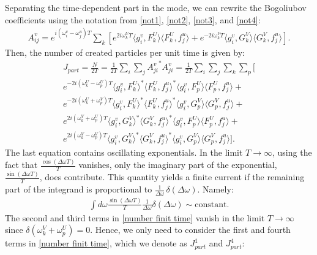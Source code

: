 \documentclass[12pt]{article}
\numberwithin{equation}{section}
\begin{document}
Separating the time-dependent part in the mode, we can rewrite the Bogoliubov coefficients using the notation from \eqref{not1}, \eqref{not2}, \eqref{not3}, and \eqref{not4}:
\begin{align}
    A^v_{ij} = e^{i (\omega^v_i - \omega^u_j) T} \sum_k \left[ e^{2 i \omega^U_k T} 
 \langle g^v_i, F^U_k \rangle \langle F^U_k, f^u_j \rangle + e^{-2 i \omega^V_k T} 
 \langle g^v_i, G^V_k \rangle \langle G^V_k, f^u_j \rangle \right].
\end{align}
Then, the number of created particles per unit time is given by:
\begin{gather}
    J_{part}=\frac{N}{2T} = \frac{1}{2T} \sum_i \sum_j {A^v_{ji}}^* A^v_{ji}
= \label{number finit time}
     \frac{1}{2T} \sum_i \sum_j \sum_k \sum_p \Bigg[ \\ \nonumber  
     e^{-2 i (\omega^U_k - \omega^U_p) T} \langle g^v_i, F^U_k \rangle^* \langle F^U_k, f^u_j \rangle^* \langle g^v_i, F^U_p \rangle \langle F^U_p, f^u_j \rangle
     + \\ \nonumber
     e^{-2 i (\omega^U_k + \omega^V_p) T} \langle g^v_i, F^U_k \rangle^* \langle F^U_k, f^u_j \rangle^* \langle g^v_i, G^V_p \rangle \langle G^V_p, f^u_j \rangle
     + \\ \nonumber
     e^{2 i (\omega^V_k + \omega^U_p) T} \langle g^v_i, G^V_k \rangle^* \langle G^V_k, f^u_j \rangle^* \langle g^v_i, F^U_p \rangle \langle F^U_p, f^u_j \rangle
     + \\ \nonumber
     e^{2 i (\omega^V_k - \omega^V_p) T} \langle g^v_i, G^V_k \rangle^* \langle G^V_k, f^u_j \rangle^* \langle g^v_i, G^V_p \rangle \langle G^V_p, f^u_j \rangle \Bigg].
\end{gather}
The last equation contains oscillating exponentials. In the limit $T \to \infty$, using the fact that $\frac{\cos(\Delta \omega T)}{T}$ vanishes, only the imaginary part of the exponential, $\frac{\sin(\Delta \omega T)}{T}$, does contribute. This quantity yields a finite current if the remaining part of the integrand is proportional to $\frac{1}{\Delta \omega}\,\delta(\Delta \omega)$. Namely:
\begin{align}\label{theconst}
    \int d\omega  \frac{\sin(\Delta \omega T)}{T}  \frac{1}{\Delta \omega} \delta(\Delta \omega) \sim \text{constant}.
\end{align}
The second and third terms in \eqref{number finit time} vanish in the limit $T \to \infty$ since $\delta(\omega_k^V + \omega_p^U) = 0$. Hence, we only need to consider the first and fourth terms in \eqref{number finit time}, which we denote as $J_{part}^1$ and $J_{part}^4$:
\end{document}
